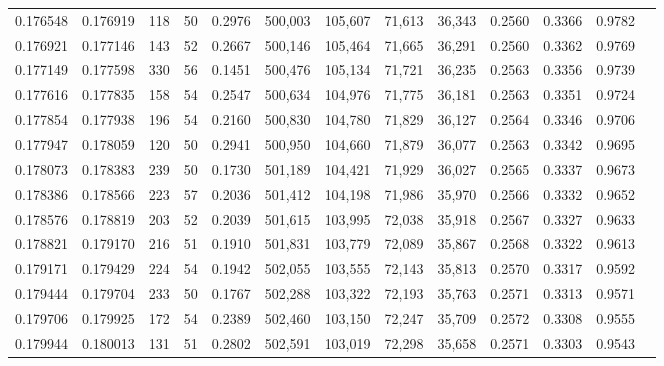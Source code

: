 \begin{tabular}{rrrrrrrrrrrrr}
0.176548 & 0.176919 &   118 &  50 &                                     0.2976 & 500,003 & 105,607 &  71,613 &  36,343 & 0.2560 & 0.3366 & 0.9782 \\
0.176921 & 0.177146 &   143 &  52 &                                     0.2667 & 500,146 & 105,464 &  71,665 &  36,291 & 0.2560 & 0.3362 & 0.9769 \\
0.177149 & 0.177598 &   330 &  56 &                                     0.1451 & 500,476 & 105,134 &  71,721 &  36,235 & 0.2563 & 0.3356 & 0.9739 \\
0.177616 & 0.177835 &   158 &  54 &                                     0.2547 & 500,634 & 104,976 &  71,775 &  36,181 & 0.2563 & 0.3351 & 0.9724 \\
0.177854 & 0.177938 &   196 &  54 &                                     0.2160 & 500,830 & 104,780 &  71,829 &  36,127 & 0.2564 & 0.3346 & 0.9706 \\
0.177947 & 0.178059 &   120 &  50 &                                     0.2941 & 500,950 & 104,660 &  71,879 &  36,077 & 0.2563 & 0.3342 & 0.9695 \\
0.178073 & 0.178383 &   239 &  50 &                                     0.1730 & 501,189 & 104,421 &  71,929 &  36,027 & 0.2565 & 0.3337 & 0.9673 \\
0.178386 & 0.178566 &   223 &  57 &                                     0.2036 & 501,412 & 104,198 &  71,986 &  35,970 & 0.2566 & 0.3332 & 0.9652 \\
0.178576 & 0.178819 &   203 &  52 &                                     0.2039 & 501,615 & 103,995 &  72,038 &  35,918 & 0.2567 & 0.3327 & 0.9633 \\
0.178821 & 0.179170 &   216 &  51 &                                     0.1910 & 501,831 & 103,779 &  72,089 &  35,867 & 0.2568 & 0.3322 & 0.9613 \\
0.179171 & 0.179429 &   224 &  54 &                                     0.1942 & 502,055 & 103,555 &  72,143 &  35,813 & 0.2570 & 0.3317 & 0.9592 \\
0.179444 & 0.179704 &   233 &  50 &                                     0.1767 & 502,288 & 103,322 &  72,193 &  35,763 & 0.2571 & 0.3313 & 0.9571 \\
0.179706 & 0.179925 &   172 &  54 &                                     0.2389 & 502,460 & 103,150 &  72,247 &  35,709 & 0.2572 & 0.3308 & 0.9555 \\
0.179944 & 0.180013 &   131 &  51 &                                     0.2802 & 502,591 & 103,019 &  72,298 &  35,658 & 0.2571 & 0.3303 & 0.9543 \\

\end{tabular}
